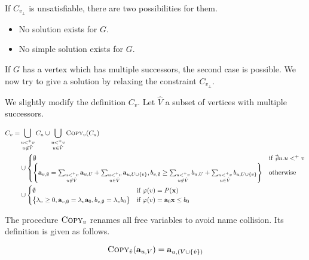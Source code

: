 \documentclass[a4paper,12pt]{article}
\begin{document}
If $C_{v_\bot}$ is unsatisfiable, there are two possibilities for them.

\begin{itemize}
\item No solution exists for $G$.
\item No simple solution exists for $G$.
\end{itemize}

If $G$ has a vertex which has multiple successors, the second case is
possible. We now try to give a solution by relaxing the constraint
$C_{v_\bot}$.

We slightly modify the definition $C_v$. Let $\hat V$ a subset of
vertices with multiple successors.

\begin{align*}
C_v = & \bigcup_{\substack{u <^+ v \\ u \not\in \hat V}} C_u \cup
\bigcup_{\substack{u <^+ v \\ u \in \hat V}} \textsc{Copy}_v (C_u)
\\
& \cup \begin{cases}
\emptyset
& \mbox{if } \nexists u. u <^+ v \\
\left\lbrace
 \mathbf{a}_{v,\emptyset} =
  \sum_{\substack{u <^+ v \\ u \not\in \hat V}} \mathbf{a}_{u,U} +
  \sum_{\substack{u <^+ v \\ u \in \hat V}} \mathbf{a}_{u,U \cup \left\lbrace v \right\rbrace},
 b_{v,\emptyset} \geq
  \sum_{\substack{u <^+ v \\ u \not\in \hat V}} b_{u,U} +
  \sum_{\substack{u <^+ v \\ u \in \hat V}} b_{u,U \cup \left\lbrace v \right\rbrace}
\right\rbrace
& \mbox{otherwise}
\end{cases}
\\
& \cup \begin{cases}
\emptyset
& \mbox{if } \varphi(v) = P(\mathbf{x}) \\
\left\lbrace
 \lambda_v \geq 0, \mathbf{a}_{v,\emptyset} = \lambda_v \mathbf{a}_0,
 b_{v,\emptyset} = \lambda_v b_0
\right\rbrace
& \mbox{if } \varphi(v) = \mathbf{a}_0 \mathbf{x} \leq b_0
\end{cases}
\end{align*}

The procedure $\textsc{Copy}_v$ renames all free variables to avoid
name collision. Its definition is given as follows.

\[\textsc{Copy}_{\hat v}(\mathbf{a}_{u,V}) = \mathbf{a}_{u,(V \cup
  \left\lbrace \hat v \right\rbrace)} \]
\end{document}
